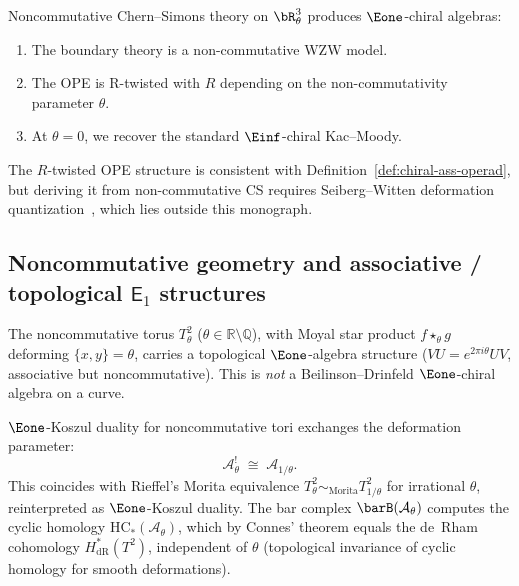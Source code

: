 \begin{conjecture}%
Noncommutative Chern--Simons theory on $\bR^3_\theta$ produces
$\Eone$-chiral algebras:
\begin{enumerate}[label=(\roman*)]
\item The boundary theory is a non-commutative WZW model.
\item The OPE is R-twisted with $R$ depending on the non-commutativity parameter $\theta$.
\item At $\theta = 0$, we recover the standard $\Einf$-chiral Kac--Moody.
\end{enumerate}
\end{conjecture}

\begin{remark}[Scope]
The $R$-twisted OPE structure is consistent with Definition~\ref*{def:chiral-ass-operad}, but deriving it from non-commutative CS requires Seiberg--Witten deformation quantization~\cite{SW99}, which lies outside this monograph.
\end{remark}


\subsection{\texorpdfstring{Noncommutative geometry and associative / topological $\mathsf{E}_1$ structures}{Noncommutative geometry and associative / topological E1 structures}}

\begin{construction}
The noncommutative torus $T^2_\theta$ ($\theta \in \mathbb{R} \setminus \mathbb{Q}$), with Moyal star product $f \star_\theta g$ deforming $\{x,y\}=\theta$, carries a topological $\Eone$-algebra structure ($VU = e^{2\pi i\theta}UV$, associative but noncommutative).  This is \emph{not} a Beilinson--Drinfeld $\Eone$-chiral algebra on a curve.
\end{construction}

\begin{conjecture}
$\Eone$-Koszul duality for noncommutative tori exchanges the deformation parameter:
\[
\mathcal{A}_\theta^! \;\cong\; \mathcal{A}_{1/\theta}.
\]
This coincides with Rieffel's Morita equivalence $T^2_\theta \sim_{\mathrm{Morita}} T^2_{1/\theta}$
for irrational $\theta$, reinterpreted as $\Eone$-Koszul duality.
The bar complex $\barB(\mathcal{A}_\theta)$ computes the cyclic homology
$\mathrm{HC}_*(\mathcal{A}_\theta)$, which by Connes' theorem equals the de~Rham
cohomology $H^*_{\mathrm{dR}}(T^2)$, independent of $\theta$ (topological invariance
of cyclic homology for smooth deformations).
\end{conjecture}

